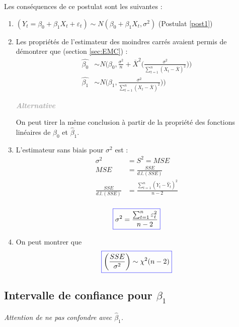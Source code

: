 \documentclass[11pt,french]{report}
\newenvironment{moreInfo}[1]
	{\begin{mdframed}
	\textcolor{darkgray}{\huge \raisebox{-3.5pt}{\faInfo} 
	\hspace{0.5cm} \large\bfseries #1}\\[5pt]
	\normalsize
	\makebox[0.1\textwidth][l]{}	
	\begin{minipage}{10cm}}
	{	\end{minipage}
	\end{mdframed}}
\begin{document}
Les conséquences de ce postulat sont les suivantes :
\begin{enumerate}
\item $(Y_t = \beta_0 + \beta_1X_t + \varepsilon_t) \sim N(\beta_0 + \beta_1X_t, \sigma^2)$ (Postulat \ref{post1})
\item Les propriétés de l'estimateur des moindres carrés avaient permis de démontrer que (section \ref{sec:EMC}) :
	\begin{align*}
	     \hat{\beta_0} &\sim N\Bigg(\beta_0, \frac{\sigma^2}{n}  + \overline{X}^2 \bigg(\frac{\sigma^2}{\sum_{t=1}^n (X_t - \overline{X})^2}\bigg)\Bigg) \\
	     \hat{\beta_1} &\sim N\Bigg(\beta_1, \frac{\sigma^2}{\sum_{t=1}^n(X_t - \overline{X})^2})\Bigg)
	\end{align*}
	
\begin{moreInfo}{\emph{Alternative}}
	On peut tirer la même conclusion à partir de la propriété des fonctions linéaires de $\hat{\beta}_0$ et $\hat{\beta}_1$.
\end{moreInfo}

\item L'estimateur sans biais pour $\sigma^2$ est :
\begin{align*}
\sigma^2 &= S^2 = MSE \\
MSE &= \frac{SSE}{d.l.(SSE)} \\
\frac{SSE}{d.l.(SSE)} &= \frac{\sum_{t=1}^n (Y_t - \hat{Y}_t)^2}{n-2} \\
\end{align*}

\begin{equation}
\label{eq:s2}
\color{blue}
\boxed{\color{black}
\sigma^2 = \frac{\sum_{t=1}^n \varepsilon_t^2}{n-2}}
\end{equation}

\item On peut montrer que 
\begin{equation}
\label{eq:ssesigma}
\color{blue}
\boxed{\color{black}
\bigg(\frac{SSE}{\sigma^2}\bigg) \sim \chi^2(n - 2) }
\end{equation}
\end{enumerate}

\subsection{Intervalle de confiance pour $\beta_1$}
\emph{Attention de ne pas confondre avec $\hat{\beta}_1$.}
\end{document}
